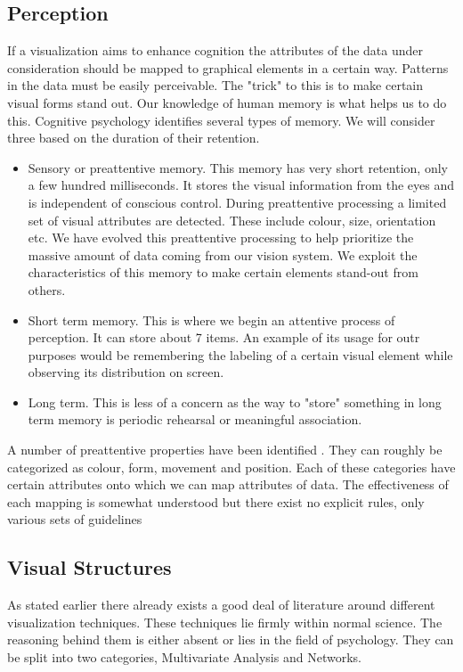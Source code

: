 \documentclass[a4paper, 10pt, titlepage]{article}
\begin{document}
\subsection{Perception}
If a visualization aims to enhance cognition the attributes of the data under consideration should be mapped to graphical elements in a certain way. Patterns in the data must be easily perceivable. The "trick" to this is to make certain visual forms stand out. Our knowledge of human memory is what helps us to do this. Cognitive psychology identifies several types of memory. We will consider three based on the duration of their retention.
\begin{itemize}
\item Sensory or preattentive memory. This memory has very short retention, only a few hundred milliseconds. It stores the visual information from the eyes and is independent of conscious control. During preattentive processing a limited set of visual attributes are detected. These include colour, size, orientation etc. We have evolved this preattentive processing to help prioritize the massive amount of data coming from our vision system. We exploit the characteristics of this memory to make certain elements stand-out from others.
\item Short term memory. This is where we begin an attentive process of perception. It can store about 7 items. An example of its usage for outr purposes would be remembering the labeling of a certain visual element while observing its distribution on screen.
\item Long term. This is less of a concern as the way to "store" something in long term memory is periodic rehearsal or meaningful association.
\end{itemize}
 A number of preattentive properties have been identified \cite{treisman1985preattentive}. They can roughly be categorized as colour, form, movement and position. Each of these categories have certain attributes onto which we can map attributes of data. The effectiveness of each mapping is somewhat understood but there exist no explicit rules, only various sets of guidelines \cite{few2004show} 

\subsection{Visual Structures}
As stated earlier there already exists a good deal of literature around different visualization techniques. These techniques lie firmly within normal science. The reasoning behind them is either absent or lies in the field of psychology. They can be split into two categories, Multivariate Analysis and Networks.
\end{document}
